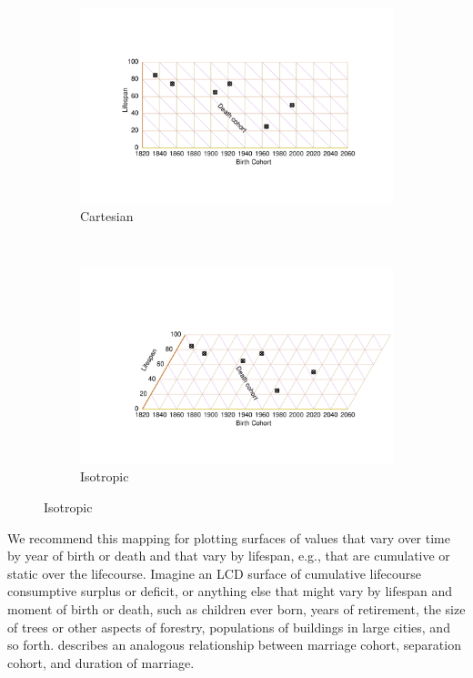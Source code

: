 \documentclass[12pt,oneside,a4paper]{article} %
\begin{document}
\begin{figure}[h!] 
\caption{An LCD diagram in two projections.}
\label{fig:LCD}
\centering
\begin{subfigure}{1.1\textwidth}
\caption{Cartesian}
\vspace{-5em}
\label{fig:LCDrt}
\includegraphics[scale=0.8]{Figures/LCDrt.pdf}
\end{subfigure}
\\\vspace{-2em}
\begin{subfigure}{1.1\textwidth}
\caption{Isotropic}
\vspace{-6em}
\label{fig:LCDeq}
\includegraphics[scale=0.8]{Figures/LCDeq.pdf}
\end{subfigure}
\end{figure} 

We
recommend this mapping for plotting surfaces of values that vary over time by year of birth or death and that vary by lifespan, e.g., that are cumulative or
static over the lifecourse. Imagine an LCD surface of cumulative lifecourse
consumptive surplus or deficit, or anything else that might vary by lifespan and
moment of birth or death, such as children ever born, years of retirement, the
size of trees or other aspects of forestry, populations of buildings in large
cities, and so forth. \citet{lexis1875einleitung} describes an analogous
relationship between marriage cohort, separation cohort, and duration of
marriage.
\end{document}

